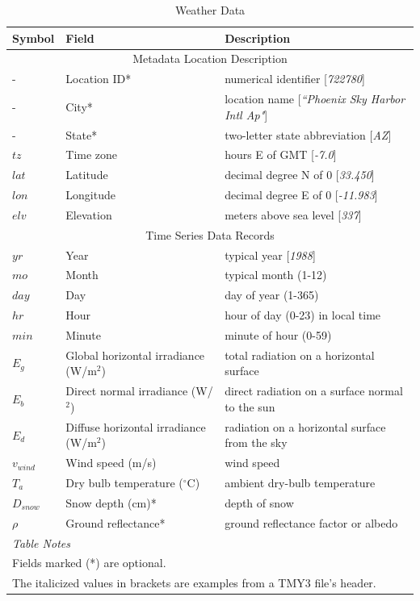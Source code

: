 \documentclass[12pt,letterpaper]{article}
\begin{document}
\begin{table}
\begin{center}
\caption{Weather Data}
\begin{tabular}{lll}
\midrule
Symbol & Field & Description\\
\midrule
\multicolumn{3}{c}{Metadata Location Description}\\
- & Location ID* & numerical identifier [\textit{722780}]\\
 - & City* & location name [\textit{``Phoenix Sky Harbor Intl Ap"}]\\
- & State* & two-letter state abbreviation [\textit{AZ}]\\
$\mathit{tz}$ &Time zone & hours E of GMT [\textit{-7.0}] \\
$\mathit{lat}$ & Latitude & decimal degree N of 0 [\textit{33.450}] \\
$\mathit{lon}$ & Longitude & decimal degree E of 0 [\textit{-11.983}]\\
$\mathit{elv}$ & Elevation & meters above sea level [\textit{337}]\\
\midrule
\multicolumn{3}{c}{Time Series Data Records}\\
$\mathit{yr}$& Year & typical year [\textit{1988}] \\
$\mathit{mo}$ & Month & typical month (1-12) \\
$\mathit{day}$ & Day & day of year (1-365) \\
$\mathit{hr}$ & Hour & hour of day (0-23) in local time \\
$\mathit{min}$ & Minute & minute of hour (0-59) \\
$E_g$ & Global horizontal irradiance (W/m$^2$) & total radiation on a horizontal surface \\
$E_b$ & Direct normal irradiance (W/$^2$) & direct radiation on a surface normal to the sun \\
$E_d$ & Diffuse horizontal irradiance (W/m$^2$) & radiation on a horizontal surface from the sky \\
$v_{wind}$ & Wind speed (m/s) & wind speed \\
$T_a$ & Dry bulb temperature ($^{\circ}$C) & ambient dry-bulb temperature \\
$D_{snow}$ & Snow depth (cm)* & depth of snow \\
$\mathit{\rho}$ & Ground reflectance* & ground reflectance factor or albedo \\
\midrule
\multicolumn{3}{l}{\textit{Table Notes}}\\
\multicolumn{3}{l}{Fields marked (*) are optional.}\\
\multicolumn{3}{l}{The italicized values in brackets are examples from a TMY3 file's header.}\\
\end{tabular}
\label{tab-wfdata}
\end{center}
\end{table}
\end{document}
